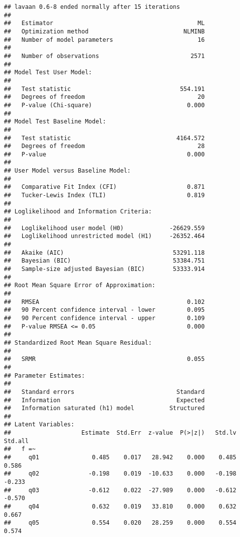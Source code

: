 \documentclass[
]{article}
\begin{document}
\begin{verbatim}
## lavaan 0.6-8 ended normally after 15 iterations
## 
##   Estimator                                         ML
##   Optimization method                           NLMINB
##   Number of model parameters                        16
##                                                       
##   Number of observations                          2571
##                                                       
## Model Test User Model:
##                                                       
##   Test statistic                               554.191
##   Degrees of freedom                                20
##   P-value (Chi-square)                           0.000
## 
## Model Test Baseline Model:
## 
##   Test statistic                              4164.572
##   Degrees of freedom                                28
##   P-value                                        0.000
## 
## User Model versus Baseline Model:
## 
##   Comparative Fit Index (CFI)                    0.871
##   Tucker-Lewis Index (TLI)                       0.819
## 
## Loglikelihood and Information Criteria:
## 
##   Loglikelihood user model (H0)             -26629.559
##   Loglikelihood unrestricted model (H1)     -26352.464
##                                                       
##   Akaike (AIC)                               53291.118
##   Bayesian (BIC)                             53384.751
##   Sample-size adjusted Bayesian (BIC)        53333.914
## 
## Root Mean Square Error of Approximation:
## 
##   RMSEA                                          0.102
##   90 Percent confidence interval - lower         0.095
##   90 Percent confidence interval - upper         0.109
##   P-value RMSEA <= 0.05                          0.000
## 
## Standardized Root Mean Square Residual:
## 
##   SRMR                                           0.055
## 
## Parameter Estimates:
## 
##   Standard errors                             Standard
##   Information                                 Expected
##   Information saturated (h1) model          Structured
## 
## Latent Variables:
##                    Estimate  Std.Err  z-value  P(>|z|)   Std.lv  Std.all
##   f =~                                                                  
##     q01               0.485    0.017   28.942    0.000    0.485    0.586
##     q02              -0.198    0.019  -10.633    0.000   -0.198   -0.233
##     q03              -0.612    0.022  -27.989    0.000   -0.612   -0.570
##     q04               0.632    0.019   33.810    0.000    0.632    0.667
##     q05               0.554    0.020   28.259    0.000    0.554    0.574

\end{verbatim}
\end{document}
